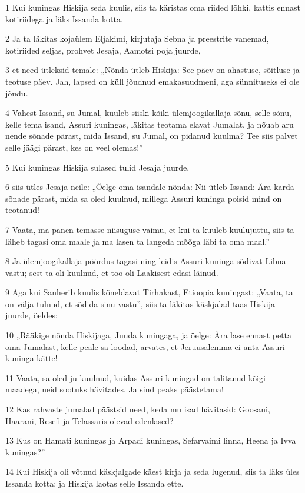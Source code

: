 \par 1 Kui kuningas Hiskija seda kuulis, siis ta käristas oma riided lõhki, kattis ennast kotiriidega ja läks Issanda kotta.
\par 2 Ja ta läkitas kojaülem Eljakimi, kirjutaja Sebna ja preestrite vanemad, kotiriided seljas, prohvet Jesaja, Aamotsi poja juurde,
\par 3 et need ütleksid temale: „Nõnda ütleb Hiskija: See päev on ahastuse, sõitluse ja teotuse päev. Jah, lapsed on küll jõudnud emakasuudmeni, aga sünnituseks ei ole jõudu.
\par 4 Vahest Issand, su Jumal, kuuleb siiski kõiki ülemjoogikallaja sõnu, selle sõnu, kelle tema isand, Assuri kuningas, läkitas teotama elavat Jumalat, ja nõuab aru nende sõnade pärast, mida Issand, su Jumal, on pidanud kuulma? Tee siis palvet selle jäägi pärast, kes on veel olemas!”
\par 5 Kui kuningas Hiskija sulased tulid Jesaja juurde,
\par 6 siis ütles Jesaja neile: „Öelge oma isandale nõnda: Nii ütleb Issand: Ära karda sõnade pärast, mida sa oled kuulnud, millega Assuri kuninga poisid mind on teotanud!
\par 7 Vaata, ma panen temasse niisuguse vaimu, et kui ta kuuleb kuulujuttu, siis ta läheb tagasi oma maale ja ma lasen ta langeda mõõga läbi ta oma maal.”
\par 8 Ja ülemjoogikallaja pöördus tagasi ning leidis Assuri kuninga sõdivat Libna vastu; sest ta oli kuulnud, et too oli Laakisest edasi läinud.
\par 9 Aga kui Sanherib kuulis kõneldavat Tirhakast, Etioopia kuningast: „Vaata, ta on välja tulnud, et sõdida sinu vastu”, siis ta läkitas käskjalad taas Hiskija juurde, öeldes:
\par 10 „Rääkige nõnda Hiskijaga, Juuda kuningaga, ja öelge: Ära lase ennast petta oma Jumalast, kelle peale sa loodad, arvates, et Jeruusalemma ei anta Assuri kuninga kätte!
\par 11 Vaata, sa oled ju kuulnud, kuidas Assuri kuningad on talitanud kõigi maadega, neid sootuks hävitades. Ja sind peaks päästetama!
\par 12 Kas rahvaste jumalad päästsid need, keda mu isad hävitasid: Goosani, Haarani, Resefi ja Telassaris olevad edenlased?
\par 13 Kus on Hamati kuningas ja Arpadi kuningas, Sefarvaimi linna, Heena ja Ivva kuningas?”
\par 14 Kui Hiskija oli võtnud käskjalgade käest kirja ja seda lugenud, siis ta läks üles Issanda kotta; ja Hiskija laotas selle Issanda ette.
